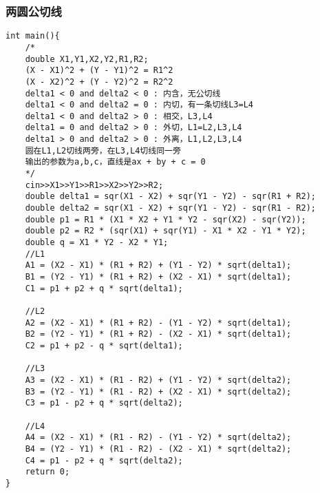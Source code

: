 \subsubsection{两圆公切线}
\begin{verbatim}
int main(){
    /*
    double X1,Y1,X2,Y2,R1,R2;
    (X - X1)^2 + (Y - Y1)^2 = R1^2
    (X - X2)^2 + (Y - Y2)^2 = R2^2
    delta1 < 0 and delta2 < 0 : 内含，无公切线
    delta1 < 0 and delta2 = 0 : 内切，有一条切线L3=L4
    delta1 < 0 and delta2 > 0 : 相交，L3,L4
    delta1 = 0 and delta2 > 0 : 外切，L1=L2,L3,L4
    delta1 > 0 and delta2 > 0 : 外离，L1,L2,L3,L4
    圆在L1,L2切线两旁，在L3,L4切线同一旁
    输出的参数为a,b,c，直线是ax + by + c = 0
    */
    cin>>X1>>Y1>>R1>>X2>>Y2>>R2;
    double delta1 = sqr(X1 - X2) + sqr(Y1 - Y2) - sqr(R1 + R2);
    double delta2 = sqr(X1 - X2) + sqr(Y1 - Y2) - sqr(R1 - R2);
    double p1 = R1 * (X1 * X2 + Y1 * Y2 - sqr(X2) - sqr(Y2));
    double p2 = R2 * (sqr(X1) + sqr(Y1) - X1 * X2 - Y1 * Y2);
    double q = X1 * Y2 - X2 * Y1;
    //L1 
    A1 = (X2 - X1) * (R1 + R2) + (Y1 - Y2) * sqrt(delta1);
    B1 = (Y2 - Y1) * (R1 + R2) + (X2 - X1) * sqrt(delta1);
    C1 = p1 + p2 + q * sqrt(delta1);

    //L2
    A2 = (X2 - X1) * (R1 + R2) - (Y1 - Y2) * sqrt(delta1);
    B2 = (Y2 - Y1) * (R1 + R2) - (X2 - X1) * sqrt(delta1);
    C2 = p1 + p2 - q * sqrt(delta1);

    //L3
    A3 = (X2 - X1) * (R1 - R2) + (Y1 - Y2) * sqrt(delta2);
    B3 = (Y2 - Y1) * (R1 - R2) + (X2 - X1) * sqrt(delta2);
    C3 = p1 - p2 + q * sqrt(delta2);

    //L4
    A4 = (X2 - X1) * (R1 - R2) - (Y1 - Y2) * sqrt(delta2); 
    B4 = (Y2 - Y1) * (R1 - R2) - (X2 - X1) * sqrt(delta2);
    C4 = p1 - p2 + q * sqrt(delta2);
    return 0;
}

\end{verbatim}


